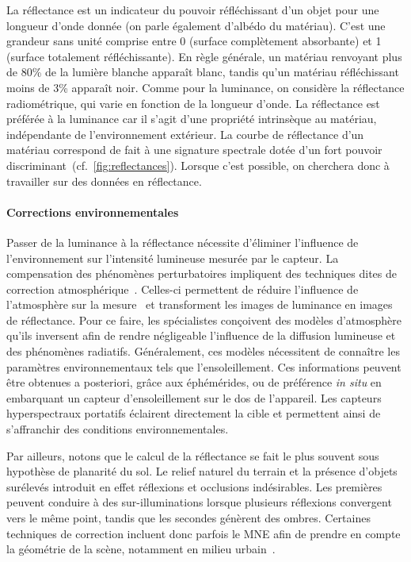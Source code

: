 La réflectance est un indicateur du pouvoir réfléchissant d'un objet pour une longueur d'onde donnée (on parle également d'albédo du matériau). C'est une grandeur sans unité comprise entre 0 (surface complètement absorbante) et 1 (surface totalement réfléchissante). En règle générale, un matériau renvoyant plus de 80\% de la lumière blanche apparaît blanc, tandis qu'un matériau réfléchissant moins de 3\% apparaît noir. Comme pour la luminance, on considère la réflectance radiométrique, qui varie en fonction de la longueur d'onde. La réflectance est préférée à la luminance car il s'agit d'une propriété intrinsèque au matériau, indépendante de l'environnement extérieur. La courbe de réflectance d'un matériau correspond de fait à une signature spectrale dotée d'un fort pouvoir discriminant~(cf.~\cref{fig:reflectances}). Lorsque c'est possible, on cherchera donc à travailler sur des données en réflectance.

\paragraph{Corrections environnementales}
Passer de la luminance à la réflectance nécessite d'éliminer l'influence de l'environnement sur l'intensité lumineuse mesurée par le capteur. La compensation des phénomènes perturbatoires impliquent des techniques dites de correction atmosphérique~\cite{deschamps_atmospheric_1980, rahman_smac_1994, chavez_image-based_1996}. Celles-ci permettent de réduire l'influence de l'atmosphère sur la mesure~\cite{gao_atmospheric_2009} et transforment les images de luminance en images de réflectance. Pour ce faire, les spécialistes conçoivent des modèles d'atmosphère qu'ils inversent afin de rendre négligeable l'influence de la diffusion lumineuse et des phénomènes radiatifs. Généralement, ces modèles nécessitent de connaître les paramètres environnementaux tels que l'ensoleillement. Ces informations peuvent être obtenues a posteriori, grâce aux éphémérides, ou de préférence \emph{in situ} en embarquant un capteur d'ensoleillement sur le dos de l'appareil. Les capteurs hyperspectraux portatifs éclairent directement la cible et permettent ainsi de s'affranchir des conditions environnementales.

Par ailleurs, notons que le calcul de la réflectance se fait le plus souvent sous hypothèse de planarité du sol. Le relief naturel du terrain et la présence d'objets surélevés introduit en effet réflexions et occlusions indésirables. Les premières peuvent conduire à des sur-illuminations lorsque plusieurs réflexions convergent vers le même point, tandis que les secondes génèrent des ombres. Certaines techniques de correction incluent donc parfois le \gls{MNE} afin de prendre en compte la géométrie de la scène, notamment en milieu urbain~\cite{ceamanos_using_2017}.

